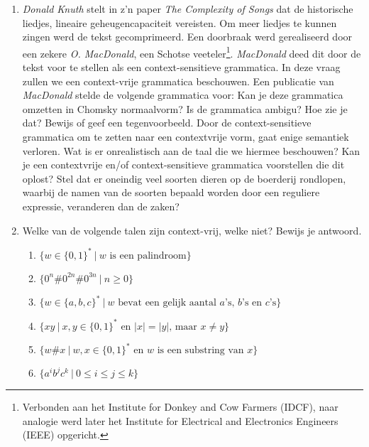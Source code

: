 \documentclass[a4paper]{article}
\begin{document}
\begin{enumerate}
   \item \emph{Donald Knuth} stelt in z'n paper \emph{The Complexity of Songs}\cite{Knuth:1984:CS:358027.358042} dat de
historische liedjes, lineaire geheugencapaciteit vereisten. Om meer liedjes te kunnen zingen werd de tekst
gecomprimeerd. Een doorbraak werd gerealiseerd door een zekere \emph{O. MacDonald}, een Schotse
veeteler\footnote{Verbonden aan het Institute for Donkey and Cow Farmers (IDCF), naar analogie werd later het Institute
for Electrical and Electronics Engineers (IEEE) opgericht.}. \emph{MacDonald} deed dit door de tekst voor te stellen als
een context-sensitieve grammatica. In deze vraag zullen we een context-vrije grammatica beschouwen.
Een publicatie van \emph{MacDonald}\cite{macdonald} stelde de volgende grammatica voor:
Kan je deze grammatica omzetten in Chomsky normaalvorm? Is de grammatica ambigu? Hoe zie je dat? Bewijs of geef een
tegenvoorbeeld. Door de context-sensitieve grammatica om te zetten naar een contextvrije vorm, gaat enige semantiek
verloren. Wat is er onrealistisch aan de taal die we hiermee beschouwen? Kan je een contextvrije en/of
context-sensitieve grammatica voorstellen die dit oplost? Stel dat er oneindig veel soorten dieren op de boerderij
rondlopen, waarbij de namen van de soorten bepaald worden door een reguliere expressie, veranderen dan de zaken?
      \item Welke van de volgende talen zijn context-vrij, welke niet? Bewijs je antwoord.
      \begin{enumerate}
			\item $\{ w \in \{0,1\}^* \ | \ \text{$w$ is een palindroom}\}$
         \item $\{ 0^n\#0^{2n}\#0^{3n} \ | \ n \geq 0 \}$
         \item $\{ w \in \{a,b,c\}^* \ | \ \text{$w$ bevat een gelijk aantal $a$'s, $b$'s en $c$'s} \}$
         \item $\{ xy \ | \ \text{$x,y \in \{0,1\}^*$ en $|x| = |y|$, maar $x \neq y$} \}$
         \item $\{ w \# x \ | \ \text{$w,x \in \{0,1\}^*$ en $w$ is een substring van $x$} \}$
			\item $\{a^ib^jc^k \ | \ 0 \leq i \leq j \leq k \}$
      \end{enumerate}
\end{enumerate}


\end{document}
